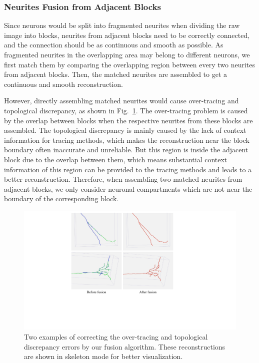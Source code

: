 \subsubsection{Neurites Fusion from Adjacent Blocks}
\label{sec:fusion}

Since neurons would be split into fragmented neurites when dividing the raw image into blocks, neurites from adjacent blocks need to be correctly connected, and the connection should be as continuous and smooth as possible.
As fragmented neurites in the overlapping area may belong to different neurons, we first match them by comparing the overlapping region between every two neurites from adjacent blocks.
Then, the matched neurites are assembled to get a continuous and smooth reconstruction. 

However, directly assembling matched neurites would cause over-tracing and topological discrepancy, as shown in Fig.~\ref{fig:overlap_discrepancy}.
The over-tracing problem is caused by the overlap between blocks when the respective neurites from these blocks are assembled.
The topological discrepancy is mainly caused by the lack of context information for tracing methods, which makes the reconstruction near the block boundary often inaccurate and unreliable.
But this region is inside the adjacent block due to the overlap between them, which means substantial context information of this region can be provided to the tracing methods and leads to a better reconstruction.
Therefore, when assembling two matched neurites from adjacent blocks, we only consider neuronal compartments which are not near the boundary of the corresponding block. 

\begin{figure}[t]
	\centering
	\includegraphics[width=1\columnwidth]{./Illustrations/neuorns_fusion2.pdf}
	\caption{Two examples of correcting the over-tracing and topological discrepancy errors by our fusion algorithm. These reconstructions are shown in skeleton mode for better visualization.}
	\label{fig:overlap_discrepancy}
\end{figure}

